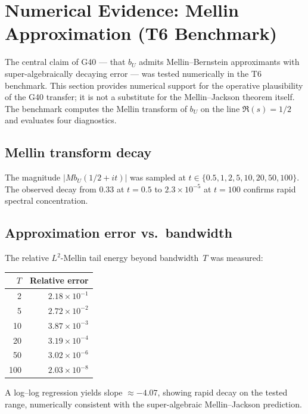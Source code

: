 \documentclass[11pt,a4paper]{article}
\begin{document}
\section{Numerical Evidence: Mellin Approximation (T6 Benchmark)}

The central claim of G40 --- that $b_U$ admits Mellin--Bernstein approximants with super-algebraically decaying error --- was tested numerically in the T6 benchmark.  This section provides numerical support for the operative plausibility of the G40 transfer; it is not a substitute for the Mellin--Jackson theorem itself.  The benchmark computes the Mellin transform of $b_U$ on the line $\Re(s)=1/2$ and evaluates four diagnostics.

\subsection{Mellin transform decay}

The magnitude $|Mb_U(1/2+it)|$ was sampled at $t\in\{0.5, 1, 2, 5, 10, 20, 50, 100\}$.  The observed decay from $0.33$ at $t=0.5$ to $2.3\times10^{-5}$ at $t=100$ confirms rapid spectral concentration.

\subsection{Approximation error vs.\ bandwidth}

The relative $L^2$-Mellin tail energy beyond bandwidth~$T$ was measured:

\begin{center}
\begin{tabular}{@{}rr@{}}
\toprule
$T$ & Relative error \\
\midrule
2 & $2.18\times10^{-1}$ \\
5 & $2.72\times10^{-2}$ \\
10 & $3.87\times10^{-3}$ \\
20 & $3.19\times10^{-4}$ \\
50 & $3.02\times10^{-6}$ \\
100 & $2.03\times10^{-8}$ \\
\bottomrule
\end{tabular}
\end{center}

A log--log regression yields slope $\approx -4.07$, showing rapid decay on the tested range, numerically consistent with the super-algebraic Mellin--Jackson prediction.
\end{document}
